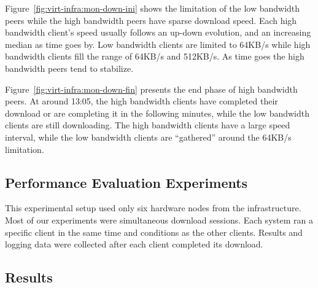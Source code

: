 Figure~\ref{fig:virt-infra:mon-down-ini} shows the limitation of the low
bandwidth peers while the high bandwidth peers have sparse download speed.
Each high bandwidth client's speed usually follows an up-down evolution, and
an increasing median as time goes by. Low bandwidth clients are limited to
64KB/s while high bandwidth clients fill the range of 64KB/s and 512KB/s. As
time goes the high bandwidth peers tend to stabilize.

Figure~\ref{fig:virt-infra:mon-down-fin} presents the end phase of high
bandwidth peers.  At around 13:05, the high bandwidth clients have completed
their download or are completing it in the following minutes, while the low
bandwidth clients are still downloading. The high bandwidth clients have a
large speed interval, while the low bandwidth clients are ``gathered'' around
the 64KB/s limitation.

\subsection{Performance Evaluation Experiments}

This experimental setup used only six hardware nodes from the infrastructure.
Most of our experiments were simultaneous download sessions. Each system ran a
specific client in the same time and conditions as the other clients. Results
and logging data were collected after each client completed its download.

\subsection{Results}


